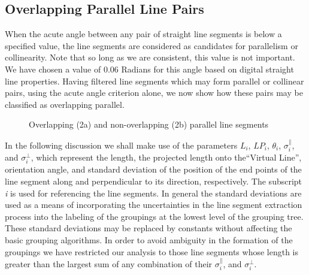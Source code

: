 \subsection{Overlapping Parallel Line Pairs}

 When the acute angle between any pair of straight line segments is below a 
specified value, the line segments are considered as candidates for 
parallelism or collinearity. Note that so long as we are consistent, this 
value is not important. We have chosen a value of 0.06 Radians for this angle
based on digital straight line properties. Having filtered line segments 
which may form parallel or collinear pairs, using the acute angle criterion 
alone, we now show how these pairs may be classified as overlapping parallel.

\begin{figure}[htbp]
\vspace*{-10mm}
\vspace*{6cm}
\vspace*{-5mm}
\caption{Overlapping (2a) and non-overlapping (2b) parallel line segments}
\label{fig:parallel}
\end{figure}

 In the following discussion we shall make use of the parameters $L_{i}$, 
$LP_{i}$, $\theta_{i}$, $\sigma^{\parallel}_{i}$, and $\sigma^{\perp}_{i}$, 
which represent the length, the projected length onto the``Virtual Line'', 
orientation angle, and standard deviation of the position of the end points of 
the line segment along and perpendicular to its direction, respectively. 
The subscript {\it i} is used for referencing the line segments. In general the 
standard deviations are used as a means of incorporating the uncertainties in 
the line segment extraction process into the labeling of the groupings at the 
lowest level of the grouping tree. These standard deviations may be replaced 
by constants without affecting the basic grouping algorithms. In order to avoid
ambiguity in the formation of the groupings we have restricted our analysis to
those line segments whose length is greater than the largest sum of any
combination of their $\sigma^{\parallel}_{i}$, and $\sigma^{\perp}_{i}$.

